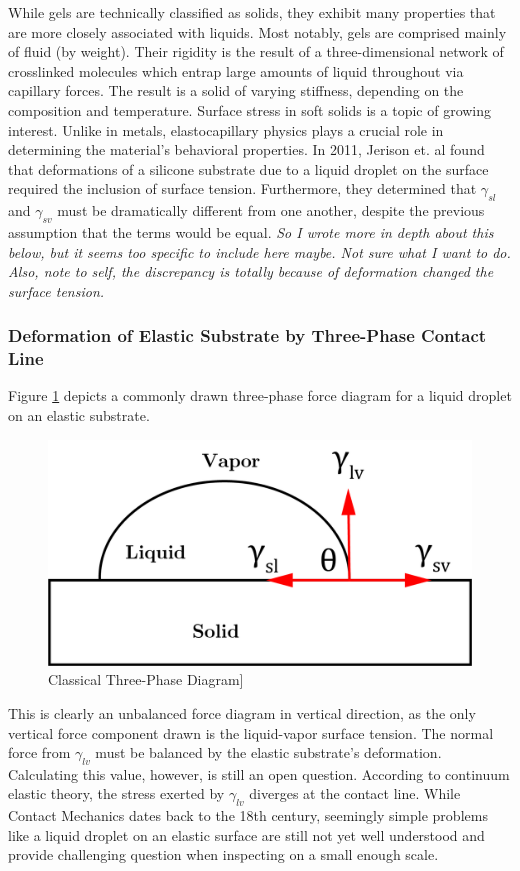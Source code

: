 While gels are technically classified as solids, they exhibit many properties that are more closely associated with liquids. Most notably, gels are comprised mainly of fluid (by weight). Their rigidity is the result of a three-dimensional network of crosslinked molecules which entrap large amounts of liquid throughout via capillary forces. The result is a solid of varying stiffness, depending on the composition and temperature. Surface stress in soft solids is a topic of growing interest. Unlike in metals, elastocapillary physics plays a crucial role in determining the material's behavioral properties. In 2011, Jerison et. al \cite{jerison2011deformation} found that deformations of a silicone substrate due to a liquid droplet on the surface required the inclusion of surface tension. Furthermore, they determined that $\gamma_{sl}$ and $\gamma_{sv}$ must be dramatically different from one another, despite the previous assumption that the terms would be equal. \emph{So I wrote more in depth about this below, but it seems too specific to include here maybe. Not sure what I want to do. Also, note to self, the discrepancy is totally because of deformation changed the surface tension.}

\subsubsection{Deformation of Elastic Substrate by Three-Phase Contact Line}
Figure \ref{fig:three-phase} depicts a commonly drawn three-phase force diagram for a liquid droplet on an elastic substrate.
\begin{figure}[h!]
	\centering
	\includegraphics[width=.6\textwidth]{Chapters/Figures/phase_diagram.PNG}
	\caption[Three-Phase Diagram]{Classical Three-Phase Diagram]}
	\label{fig:three-phase} 
\end{figure}


This is clearly an unbalanced force diagram in vertical direction, as the only vertical force component drawn is the liquid-vapor surface tension. The normal force from $\gamma_{lv}$ must be balanced by the elastic substrate's deformation. Calculating this value, however, is still an open question. According to continuum elastic theory, the stress exerted by $\gamma_{lv}$ diverges \cite{jerison2011deformation} at the contact line. While Contact Mechanics dates back to the 18th century, seemingly simple problems like a liquid droplet on an elastic surface are still not yet well understood and provide challenging question when inspecting on a small enough scale.

